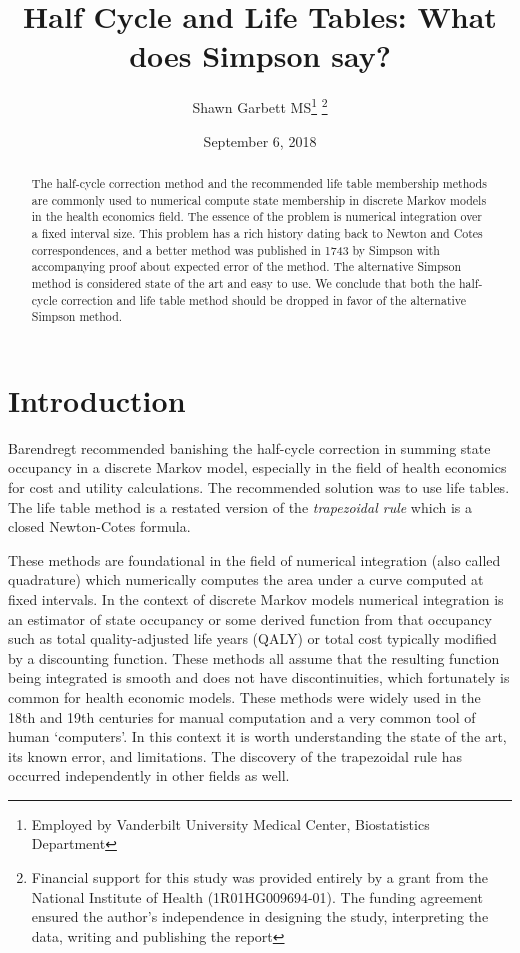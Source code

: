 \documentclass[]{article}
\title{Half Cycle and Life Tables: What does Simpson say?}
\author{Shawn Garbett MS\footnote{Employed by Vanderbilt University Medical Center,
  Biostatistics Department} \footnote{Financial support for this study was provided entirely by a grant from the 
  National Institute of Health (1R01HG009694-01). The funding agreement ensured the author's independence in designing the study, interpreting the data, writing and publishing the report }}
\date{September 6, 2018}
\begin{document}
\maketitle
\begin{abstract}
The half-cycle correction method and the recommended life table
membership methods are commonly used to numerical compute state
membership in discrete Markov models in the health economics field. The
essence of the problem is numerical integration over a fixed interval
size. This problem has a rich history dating back to Newton and Cotes
correspondences, and a better method was published in 1743 by Simpson
with accompanying proof about expected error of the method. The
alternative Simpson method is considered state of the art and easy to
use. We conclude that both the half-cycle correction and life table
method should be dropped in favor of the alternative Simpson method.
\end{abstract}

\section{Introduction}

Barendregt\cite{barendregt2009} recommended banishing the half-cycle correction in
summing state occupancy in a discrete Markov model, especially in the
field of health economics for cost and utility
calculations\cite{barendregt2009,naimark2008,sonnenberg1993}. The
recommended solution was to use life tables. The life table method is a
restated version of the \emph{trapezoidal rule} which is a closed
Newton-Cotes formula.

These methods are foundational in the field of numerical integration
(also called quadrature) which numerically computes the area under a
curve computed at fixed intervals. In the context of discrete Markov
models numerical integration is an estimator of state occupancy or some
derived function from that occupancy such as total quality-adjusted life
years (QALY) or total cost typically modified by a discounting function.
These methods all assume that the resulting function being integrated is
smooth and does not have discontinuities, which fortunately is common
for health economic models. These methods were widely used in the 18th
and 19th centuries for manual computation and a very common tool of
human `computers'\cite{epperson2007}. In this context it is worth
understanding the state of the art, its known error, and limitations.
The discovery of the trapezoidal rule has occurred independently in
other fields as well\cite{tai1994}.
\end{document}
